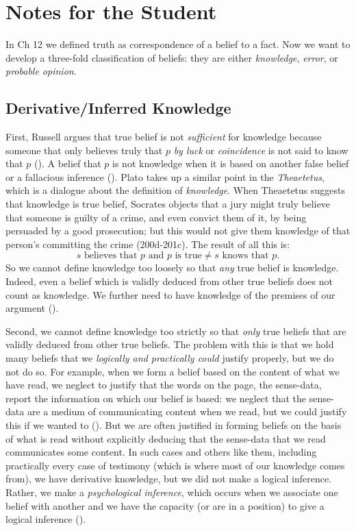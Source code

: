 \documentclass[oneside,letterpaper,12pt]{book}
\begin{document}
\pagebreak
	\section{Notes for the Student}
In Ch 12 we defined truth as correspondence of a belief to a fact. Now we want to develop a three-fold classification of beliefs: they are either \textit{knowledge}, \textit{error}, or \textit{probable opinion}.
\subsection*{Derivative/Inferred Knowledge}
First, Russell argues that true belief is not \textit{sufficient} for knowledge because someone that only believes truly that $p$ \textit{by luck} or \textit{coincidence} is not said to know that $p$ (\pageref{luck}). A belief that $p$ is not knowledge when it is based on another false belief or a fallacious inference (\pageref{fallacious}). Plato takes up a similar point in the \textit{Theaetetus}, which is a dialogue about the definition of \textit{knowledge}. When Theaetetus suggests that knowledge is true belief, Socrates objects that a jury might truly believe that someone is guilty of a crime, and even convict them of it, by being persuaded by a good prosecution; but this would not give them knowledge of that person's committing the crime (200d-201c). The result of all this is:
	\[ s \text{ believes that } p \text{ and } p \text{ is true} \neq s \text{ knows that } p. \]
So we cannot define knowledge too loosely so that \textit{any} true belief is knowledge. Indeed, even a belief which is validly deduced from other true beliefs does not count as knowledge. We further need to have knowledge of the premises of our argument (\pageref{premises}).

Second, we cannot define knowledge too strictly so that \textit{only} true beliefs that are validly deduced from other true beliefs. The problem with this is that we hold many beliefs that we \textit{logically and practically could} justify properly, but we do not do so. For example, when we form a belief based on the content of what we have read, we neglect to justify that the words on the page, the sense-data, report the information on which our belief is based: we neglect that the sense-data are a medium of communicating content when we read, but we could justify this if we wanted to (\pageref{reading}). But we are often justified in forming beliefs on the basis of what is read without explicitly deducing that the sense-data that we read communicates some content. In such cases and others like them, including practically every case of testimony (which is where most of our knowledge comes from), we have derivative knowledge, but we did not make a logical inference. Rather, we make a \textit{psychological inference}, which occurs when we associate one belief with another and we have the capacity (or are in a position) to give a logical inference (\pageref{psycho}).
\end{document}
